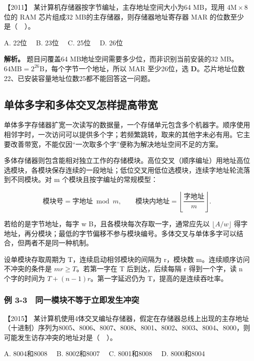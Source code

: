 \noindent{}【2011】 某计算机存储器按字节编址，主存地址空间大小为64 MB，现用 \(4\mathrm M\times8\) 位的 RAM 芯片组成32 MB的主存储器，则存储器地址寄存器 MAR 的位数至少是（　）。

A. 22位　 B. 23位　 C. 25位　 D. 26位


\textbf{解析。} 题目问覆盖64 MB地址空间需要多少位，而非识别当前安装的32 MB。\(64\mathrm{MB}=2^{26}\mathrm B\)，每个字节一个地址，所以 MAR 至少26位，选 \textbf{D}。芯片地址位数22、已安装容量地址位数25都不能回答这一问题。

\subsection{单体多字和多体交叉怎样提高带宽}\label{co-03-04}

单体多字存储器扩宽一次读写的数据量，一个存储单元包含多个机器字。顺序使用相邻字时，一次访问可以提供多个字；若频繁跳转，取来的其他字未必有用。它主要改善带宽，不能仅因``一次取多个字''便称为解决地址空间不足的方案。

多体存储器则包含能相对独立工作的存储模块。高位交叉（顺序编址）用地址高位选模块，各模块保存连续的一段地址；低位交叉用低位选模块，连续字地址轮流落到不同模块。对 m 个模块且按字编址的常规模型：

\[
\text{模块号}=\text{字地址}\bmod m,\qquad
\text{模块内地址}=\left\lfloor\frac{\text{字地址}}m\right\rfloor.
\]

若给的是字节地址，每字 w B，且各模块每次存取一字，通常应先以 \(\lfloor A/w\rfloor\) 得字地址，再分模块；最低的字节偏移不参与模块编号。多体交叉与单体多字可以结合，但两者不是同一种机制。

设单模块存取周期为 T，连续启动相邻模块的间隔为 r，模块数 m。连续顺序访问不冲突的条件是 \(mr\ge T\)。若第一字在 T 后到达，后续每隔 r 得到一个字，读 n 个字的时间为 \(T+(n-1)r\)。第一字延迟仍为 T，提高的是连续吞吐率。

\subsubsection{例 3-3　同一模块不等于立即发生冲突}\label{co-ex3-3}

\noindent{}【2015】 某计算机使用4体交叉编址存储器，假定在存储器总线上出现的主存地址（十进制）序列为8005、8006、8007、8008、8001、8002、8003、8004、8000，则可能发生访存冲突的地址对是（　）。

A. 8004和8008　 B. 8002和8007　 C. 8001和8008　 D. 8000和8004


